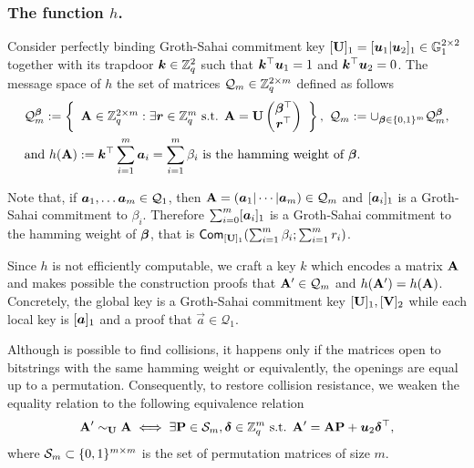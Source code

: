 
\subsubsection{The function $h$.} Consider perfectly binding Groth-Sahai commitment key $[\mathbf{{U}}]_1 = [{\boldsymbol{u}}_1|{\boldsymbol{u}}_2]_1\in\mathbb{G}_1^{2\times 2}$ together with its trapdoor ${\boldsymbol{k}}\in\mathbb{Z}_q^2$ such that ${\boldsymbol{k}}^\top{\boldsymbol{u}}_1 = 1$ and ${\boldsymbol{k}}^\top{\boldsymbol{u}}_2 = 0$. The message space of $h$ the set of matrices $\mathcal{Q}_m\in\mathbb{Z}_q^{2\times m}$ defined as follows
\begin{align*}
&\mathcal{Q}_m^{\boldsymbol{\beta}} := \left\{
\begin{array}{c}
\mathbf{{A}} \in \mathbb{Z}_q^{2\times m}:
\exists {\boldsymbol{r}}\in\mathbb{Z}_q^m\text{ s.t. }
{\mathbf{{A}} = \mathbf{{U}}\left(\begin{matrix}{\boldsymbol{\beta}}^\top\\{\boldsymbol{r}}^\top\end{matrix}\right)
}
\end{array}\right\},
\ \mathcal{Q}_m := \cup_{{\boldsymbol{\beta}}\in\{0,1\}^m} \mathcal{Q}_m^{\boldsymbol{\beta}},\\
&\text{and } h(\mathbf{{A}}):= {\boldsymbol{k}}^\top\sum_{i=1}^m{\boldsymbol{a}}_i = \sum_{i=1}^m \beta_i \text{ is the hamming weight of }{\boldsymbol{\beta}}.
\end{align*}

Note that, if ${\boldsymbol{a}}_1,\ldots {\boldsymbol{a}}_m\in\mathcal{Q}_{1}$, then $\matr{A} = (\vec{a}_1\cat\cdots\cat\vecb{a}_m)\in\mathcal{Q}_{m}$ and $[{\boldsymbol{a}}_i]_1$ is a Groth-Sahai commitment to $\beta_i$.
Therefore $\sum_{i=0}^m[{\boldsymbol{a}}_i]_1$ is a Groth-Sahai commitment to the hamming weight of ${\boldsymbol{\beta}}$, that is $\mathsf{Com}_{[\mathbf{{U}}]_1}(\sum_{i=1}^m \beta_i;\sum_{i=1}^m r_i)$.

Since $h$ is not efficiently computable, we craft a key $k$ which encodes a matrix $\mathbf{{A}}$ and makes possible the construction proofs that $\mathbf{{A}}'\in\mathcal{Q}_m$ and $h(\mathbf{{A}}')=h(\mathbf{{A}})$. Concretely, the global key is a Groth-Sahai commitment key $[\mathbf{{U}}]_1,[\mathbf{{V}}]_2$ while each local key is $[{\boldsymbol{a}}]_1$ and a proof that $\vec{a}\in\mathcal{Q}_1$.

Although is possible to find collisions, it happens only if the matrices open to bitstrings with the same hamming weight or equivalently, the openings are equal up to a permutation. Consequently, to restore collision resistance, we weaken the equality relation to the following equivalence relation
$$
\mathbf{{A}}' \sim_{\mathbf{{U}}} \mathbf{{A}} \iff \exists \mathbf{{P}}\in\mathcal{S}_m, {\boldsymbol{\delta}}\in\mathbb{Z}_q^m \text{ s.t. } \mathbf{{A}}' = \mathbf{{A}}\mathbf{{P}} + {\boldsymbol{u}}_2{\boldsymbol{\delta}}^\top,
$$
where $\mathcal{S}_m\subset \{0,1\}^{m\times m}$ is the set of permutation matrices of size $m$.

